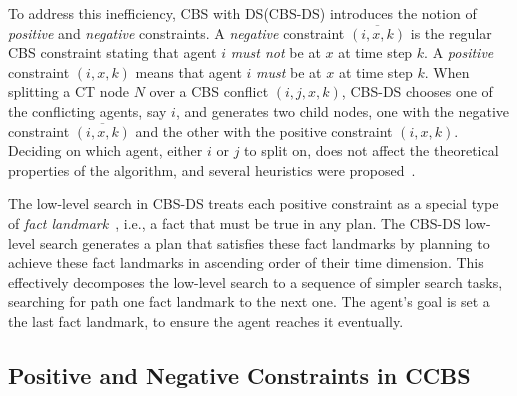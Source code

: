 \documentclass[letterpaper]{article} %
\newcommand\konstantin[1]{\nb{\textbf{Konstantin:}}{red}{#1}}
\newcommand\roni[1]{\nb{\textbf{Roni:}}{orange}{#1}}
\newcommand{\cbs}{\ac{CBS}\xspace}
\newcommand{\ccbs}{\ac{CCBS}\xspace}
\newcommand{\cbsds}{{CBS-DS}\xspace}
\newcommand{\ct}{\ac{CT}\xspace}
\newcommand{\mapf}{\ac{MAPF}\xspace}
\newcommand{\ds}{\ac{DS}\xspace}
\begin{document}
To address this inefficiency, \cbs with \ds (\cbsds) introduces the notion of \emph{positive} and \emph{negative} constraints.
A \emph{negative} constraint $\overline{(i, x, k)}$ is the regular \cbs constraint stating that agent $i$ \emph{must not} be at $x$ at time step $k$.
A \emph{positive} constraint $(i, x, k)$ means that agent $i$ \emph{must} be at $x$ at time step $k$. %
When splitting a \ct node $N$ over a \cbs conflict $(i, j, x, k)$,
\cbsds chooses one of the conflicting agents, say $i$,
and generates two child nodes, one with the negative constraint $\overline{(i, x, k)}$
and the other with the positive constraint $(i,x,k)$.
Deciding on which agent, either $i$ or $j$ to split on, does not affect the theoretical properties of the algorithm, and several heuristics were proposed~\cite{li2019disjoint}.

The low-level search in \cbsds
treats each positive constraint as a special type of \emph{fact landmark}~\cite{richter2008landmarks}, i.e., a fact that must be true in any plan. %
The \cbsds low-level search generates a plan that satisfies these fact landmarks by
planning to achieve these fact landmarks in ascending order of their time dimension.
This effectively decomposes the low-level search to a sequence of simpler search tasks, searching for path one fact landmark to the next one.
The agent's goal is set a the last fact landmark, to ensure the agent reaches it eventually. %


\subsection{Positive and Negative Constraints in \ccbs}
\end{document}
